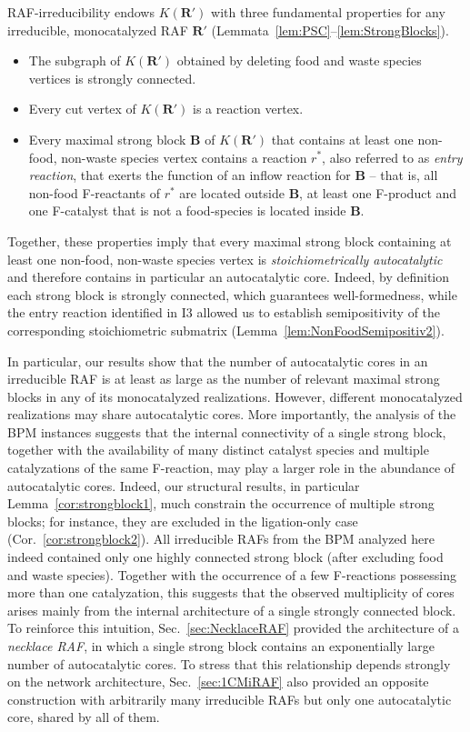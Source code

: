 \documentclass[pdflatex]{sn-jnl}
\theoremstyle{thmstyleone}%
\theoremstyle{examplesty}%
\theoremstyle{thmstylethree}%
\newcommand{\king}{K}
\newcommand{\RAF}[0]{\mathbf{R}'}
\newcommand{\block}[0]{\mathbf{B}}
\newcommand{\NV}[1]{\begingroup\color{teal}#1\endgroup}
\begin{document}
RAF-irreducibility endows $\king(\RAF)$ with three fundamental properties for
any irreducible, monocatalyzed RAF $\RAF$
(Lemmata~\ref{lem:PSC}--\ref{lem:StrongBlocks}).
\begin{itemize}
	\item[I1.] The subgraph of $\king(\RAF)$ obtained by deleting food and waste species vertices is strongly connected.
	\item[I2.] Every cut vertex of $\king(\RAF)$ is a reaction \NV{ vertex}.
	\item[I3.] Every maximal strong block $\block$ of $\king(\RAF)$ that contains 
		      at least one non-food, non-waste species vertex contains a reaction 
		      $r^*$, also referred to as \emph{entry reaction}, that exerts the function of 
		      an inflow reaction for $\block$ -- that is, all non-food F-reactants of $r^*$ are located 
		      outside $\block$, at least one F-product and one F-catalyst that is not a food-species 
		      is located inside $\block$.
\end{itemize}
Together, these properties imply that every maximal strong block containing at least one non-food, non-waste species vertex 
is \emph{stoichiometrically autocatalytic} and therefore contains in particular an autocatalytic core. Indeed, by definition each 
strong block is strongly connected, which guarantees well-formedness, while the entry reaction identified in I3 allowed us to 
establish semipositivity of the corresponding stoichiometric submatrix (Lemma~\ref{lem:NonFoodSemipositiv2}).

In particular, our results show that the number of autocatalytic cores in an irreducible RAF is at least as large as the number 
of relevant maximal strong blocks in any of its monocatalyzed realizations. However, different monocatalyzed realizations may 
share autocatalytic cores. More importantly, the analysis of the BPM instances suggests that the internal connectivity of a single 
strong block, together with the availability of many distinct catalyst species and multiple catalyzations of the same F-reaction, 
may play a larger role in the abundance of autocatalytic cores. Indeed, our structural results, in particular Lemma~\ref{cor:strongblock1}, 
much constrain the occurrence of multiple strong blocks; for instance, they are excluded in the ligation-only case (Cor.~\ref{cor:strongblock2}). 
All irreducible RAFs from the BPM analyzed here indeed contained only one highly connected strong block (after excluding food and waste species). 
Together with the occurrence of a few F-reactions possessing more than one catalyzation, this suggests that the observed 
multiplicity of cores arises mainly from the internal architecture of a single strongly connected block. To reinforce this intuition, 
Sec.~\ref{sec:NecklaceRAF} provided the architecture of a \emph{necklace RAF}, in which a single strong block contains an 
exponentially large number of autocatalytic cores. To stress that this relationship depends strongly on the network architecture, 
Sec.~\ref{sec:1CMiRAF} also provided an opposite construction with arbitrarily many irreducible RAFs but only one autocatalytic core, shared by all of them.
\end{document}
